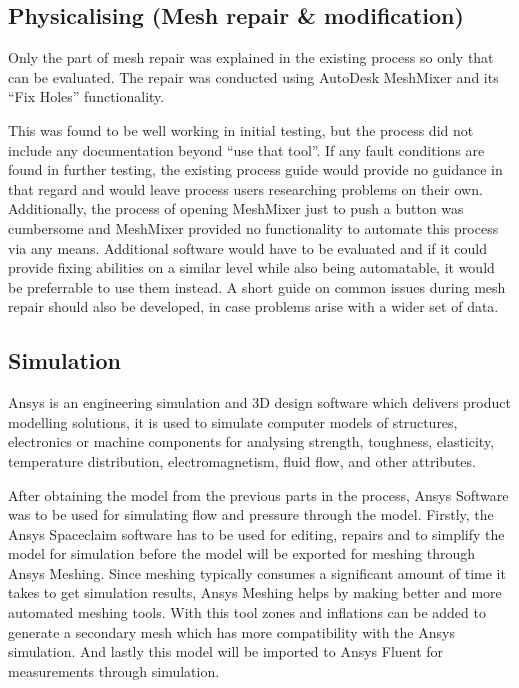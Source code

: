 \documentclass[MME,Projekt,english]{twbook}%
\begin{document}
\newpage
\subsection{Physicalising (Mesh repair \& modification)}

Only the part of mesh repair was explained in the existing process so only that can be evaluated. The repair was conducted using AutoDesk MeshMixer and its “Fix Holes” functionality.

This was found to be well working in initial testing, but the process did not include any documentation beyond “use that tool”. If any fault conditions are found in further testing, the existing process guide would provide no guidance in that regard and would leave process users researching problems on their own. Additionally, the process of opening MeshMixer just to push a button was cumbersome and MeshMixer provided no functionality to automate this process via any means. Additional software would have to be evaluated and if it could provide fixing abilities on a similar level while also being automatable, it would be preferrable to use them instead. A short guide on common issues during mesh repair should also be developed, in case problems arise with a wider set of data.

\subsection{Simulation}

Ansys is an engineering simulation and 3D design software which delivers product modelling solutions, it is used to simulate computer models of structures, electronics or machine components for analysing strength, toughness, elasticity, temperature distribution, electromagnetism, fluid flow, and other attributes. 

After obtaining the model from the previous parts in the process, Ansys Software was to be used for simulating flow and pressure through the model. Firstly, the Ansys Spaceclaim software has to be used for editing, repairs and to simplify the model for simulation before the model will be exported for meshing through Ansys Meshing. Since meshing typically consumes a significant amount of time it takes to get simulation results, Ansys Meshing helps by making better and more automated meshing tools. 
With this tool zones and inflations can be added to generate a secondary mesh which has more compatibility with the Ansys simulation. And lastly this model will be imported to Ansys Fluent for measurements through simulation.
\end{document}
